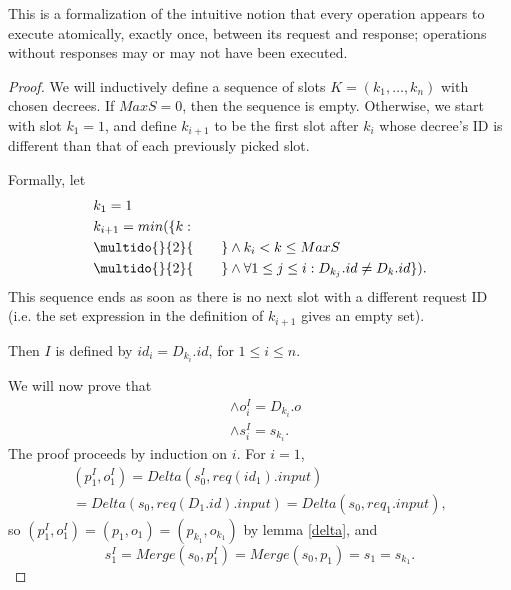 \documentclass[12pt,a4paper,en]{pracamgr}
\newcommand{\ind}[1]{\multido{}{#1}{\qquad}}
\begin{document}
This is a formalization of the intuitive notion that every operation appears to execute atomically, exactly once, between its request and response; operations without responses may or may not have been executed.
\begin{proof}
    We will inductively define a sequence of slots $K = (k_1, \dots, k_n)$ with chosen decrees. If $MaxS = 0$, then the sequence is empty. Otherwise, we start with slot $k_1 = 1$, and define $k_{i+1}$ to be the first slot after $k_i$ whose decree's ID is different than that of each previously picked slot.

    Formally, let
    \begin{align*}
        & k_1 = 1\\
        & k_{i+1} = min(\{k:\\
        & \ind{2} \land k_i < k \le MaxS\\
        & \ind{2} \land \forall 1 \le j \le i: D_{k_j}.id \neq D_k.id\}).
    \end{align*}
    This sequence ends as soon as there is no next slot with a different request ID (i.e. the set expression in the definition of $k_{i+1}$ gives an empty set).

    Then $I$ is defined by $id_i = D_{k_i}.id$, for $1 \le i \le n$.

    We will now prove that
    \begin{align*}
        & \land o_i^I = D_{k_i}.o\\
        & \land s_i^I = s_{k_i}.
    \end{align*}
    The proof proceeds by induction on $i$. For $i = 1$,
    \begin{multline*}
        (p_1^I, o_1^I) = Delta(s_0^I, req(id_1).input)\\
            = Delta(s_0, req(D_1.id).input) = Delta(s_0, req_1.input),
    \end{multline*}
    so $(p_1^I, o_1^I) = (p_1, o_1) = (p_{k_1}, o_{k_1})$ by lemma \ref{delta}, and
    $$s_1^I = Merge(s_0, p_1^I) = Merge(s_0, p_1) = s_1 = s_{k_1}.$$


\end{proof}
\end{document}
